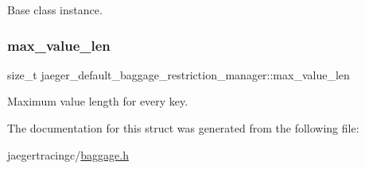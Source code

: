 Base class instance. 

\mbox{\label{structjaeger__default__baggage__restriction__manager_acfc66e81601e92bb3ef1b43ceca9fc19}} 
\subsubsection{\texorpdfstring{max\+\_\+value\+\_\+len}{max\_value\_len}}
{\footnotesize\ttfamily size\+\_\+t jaeger\+\_\+default\+\_\+baggage\+\_\+restriction\+\_\+manager\+::max\+\_\+value\+\_\+len}



Maximum value length for every key. 



The documentation for this struct was generated from the following file\+:\begin{DoxyCompactItemize}
\item 
jaegertracingc/\mbox{\hyperlink{baggage_8h}{baggage.\+h}}\end{DoxyCompactItemize}
